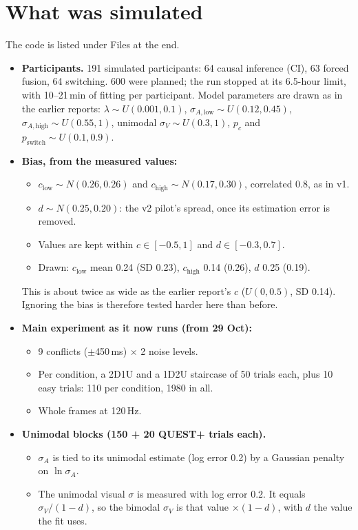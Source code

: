 \documentclass[11pt,a4paper]{article}
\newcommand{\pc}{p_c}
\begin{document}
\section{What was simulated}\label{sec:sim}
The code is listed under Files at the end.
\begin{itemize}
\item \textbf{Participants.} 191 simulated participants: 64 causal inference (CI), 63 forced fusion, 64 switching. 600 were planned; the run stopped at its 6.5-hour limit, with 10--21\,min of fitting per participant. Model parameters are drawn as in the earlier reports: $\lambda \sim U(0.001, 0.1)$, $\sigma_{A,\text{low}} \sim U(0.12, 0.45)$, $\sigma_{A,\text{high}} \sim U(0.55, 1)$, unimodal $\sigma_V \sim U(0.3, 1)$, $\pc$ and $p_\text{switch} \sim U(0.1, 0.9)$.
\item \textbf{Bias, from the measured values:}
  \begin{itemize}
  \item $c_\text{low} \sim N(0.26, 0.26)$ and $c_\text{high} \sim N(0.17, 0.30)$, correlated 0.8, as in v1.
  \item $d \sim N(0.25, 0.20)$: the v2 pilot's spread, once its estimation error is removed.
  \item Values are kept within $c \in [-0.5, 1]$ and $d \in [-0.3, 0.7]$.
  \item Drawn: $c_\text{low}$ mean 0.24 (SD 0.23), $c_\text{high}$ 0.14 (0.26), $d$ 0.25 (0.19).
  \end{itemize}
  This is about twice as wide as the earlier report's $c$ ($U(0, 0.5)$, SD 0.14). Ignoring the bias is therefore tested harder here than before.
\item \textbf{Main experiment as it now runs (from 29 Oct):}
  \begin{itemize}
  \item 9 conflicts ($\pm$450\,ms) $\times$ 2 noise levels.
  \item Per condition, a 2D1U and a 1D2U staircase of 50 trials each, plus 10 easy trials: 110 per condition, 1980 in all.
  \item Whole frames at 120\,Hz.
  \end{itemize}
\item \textbf{Unimodal blocks (150 + 20 QUEST+ trials each).}
  \begin{itemize}
  \item $\sigma_A$ is tied to its unimodal estimate (log error 0.2) by a Gaussian penalty on $\ln \sigma_A$.
  \item The unimodal visual $\sigma$ is measured with log error 0.2. It equals $\sigma_V / (1 - d)$, so the bimodal $\sigma_V$ is that value $\times (1 - d)$, with $d$ the value the fit uses.

\end{itemize}
\end{itemize}
\end{document}
